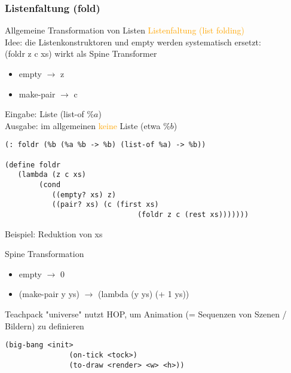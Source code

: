 \documentclass[paper=a4, fontsize=11pt]{scrartcl}
\numberwithin{equation}{section}
\numberwithin{figure}{section}
\numberwithin{table}{section}
\begin{document}
\begin{lstlistig}
\subsubsection{Listenfaltung (fold)}

Allgemeine Transformation von Listen \textcolor{orange}{Listenfaltung (list folding)} \\
Idee: die Listenkonstruktoren und empty werden systematisch ersetzt: \\


(foldr z c xs) wirkt als Spine Transformer \\
\begin{itemize}
\item empty $\rightarrow$ z
\item make-pair $\rightarrow$ c
\end{itemize}

Eingabe: Liste (list-of $\%a$) \\
Ausgabe: im allgemeinen \textcolor{orange}{keine} Liste (etwa $\%b$)

\begin{lstlisting}
(: foldr (%b (%a %b -> %b) (list-of %a) -> %b))

(define foldr
   (lambda (z c xs)
        (cond
           ((empty? xs) z)
           ((pair? xs) (c (first xs)
                               (foldr z c (rest xs)))))))
\end{lstlisting}

Beispiel: Reduktion von xs


Spine Transformation \\
\begin{itemize}
\item empty $\rightarrow$ 0
\item (make-pair y ys) $\rightarrow$ (lambda (y ys) (+ 1 ys))
\end{itemize}

Teachpack "universe" nutzt HOP, um Animation (= Sequenzen von Szenen / Bildern) zu definieren \\
\begin{lstlisting}
(big-bang <init>
               (on-tick <tock>)
               (to-draw <render> <w> <h>))
\end{lstlisting}


\end{lstlistig}
\end{document}
